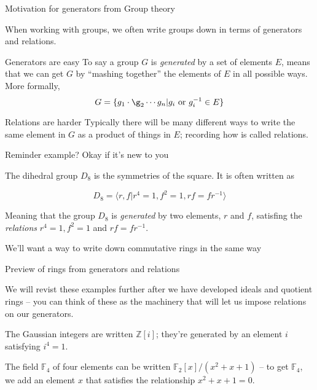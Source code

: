 \documentclass{beamer}
\begin{document}
\begin{frame}{Motivation for generators from Group theory}

When working with groups, we often write groups down in terms of generators and relations.

\begin{block}{Generators are easy}
To say a group $G$ is \emph{generated} by a set of elements $E$, means that we can get $G$ by ``mashing together'' the elements of $E$ in all possible ways. More formally, 
$$G=\{g_1\cdot\g_2\cdots g_n | g_i \text{ or } g_i^{-1}\in E\}$$
\end{block}


\begin{block}{Relations are harder}
Typically there will be many different ways to write the same element in $G$ as a product of things in $E$; recording how is called relations.
\end{block}
\end{frame}

\begin{frame}{Reminder example?  Okay if it's new to you }
\begin{example}
The dihedral group $D_{8}$ is the symmetries of the square.  It is often written as

$$D_8=\langle r,f | r^4=1, f^2=1, rf=fr^{-1}\rangle $$

Meaning that the group $D_8$ is \emph{generated} by two elements, $r$ and $f$, satisfing the \emph{relations} $r^4=1, f^2=1$ and $rf=fr^{-1}$.
\end{example}

\begin{block}{We'll want a way to write down commutative rings in the same way}
\end{block}


\end{frame}


\begin{frame}{Preview of rings from generators and relations}

We will revist these examples further after we have developed ideals and quotient rings -- you can think of these as the machinery that will let us impose relations on our generators.

\begin{example}
The Gaussian integers are written $\mathbb{Z}[i]$; they're generated by an element $i$ satisfying $i^4=1$.
\end{example}

\begin{example}
The field $\mathbb{F}_4$ of four elements can be written $\mathbb{F}_2[x]/(x^2+x+1)$ -- to get $\mathbb{F}_4$, we add an element $x$ that satisfies the relationship $x^2+x+1=0$.
\end{example}

\end{frame}
\end{document}
